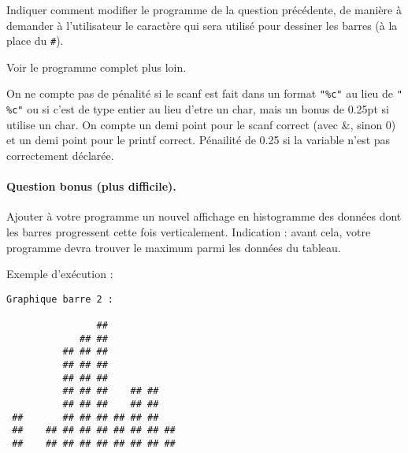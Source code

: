 \question
Indiquer comment modifier le programme de la question précédente, de manière à demander à l'utilisateur le caractère qui sera utilisé pour dessiner les barres (à la place du \verb+#+).

\begin{correction}
Voir le programme complet plus loin.
\end{correction}
\begin{baremeenv}
    On ne compte pas de pénalité si le scanf est fait dans un format
    \verb+"%c"+ au lieu de \verb+" %c"+ ou si c'est de type entier au lieu
     d'etre un char, mais  un bonus de 0.25pt si utilise un char. 
On compte un demi point pour le scanf correct (avec \&, sinon 0) et un demi point pour le
printf correct. 
Pénailité de 0.25 si la variable n'est pas correctement
déclarée.
\end{baremeenv}

\paragraph{Question bonus (plus difficile).}
Ajouter à votre programme un nouvel affichage en histogramme des données dont les barres progressent cette fois verticalement. Indication : avant cela, votre programme devra trouver le maximum parmi les données du tableau.

Exemple d'exécution :
\begin{small}
\begin{verbatim}
Graphique barre 2 :

                ##            
             ## ##            
          ## ## ##            
          ## ## ##            
          ## ## ##            
          ## ## ##    ## ##   
          ## ## ##    ## ##   
 ##       ## ## ## ## ## ##   
 ##    ## ## ## ## ## ## ## ##
 ##    ## ## ## ## ## ## ## ##
\end{verbatim}

\end{small}

